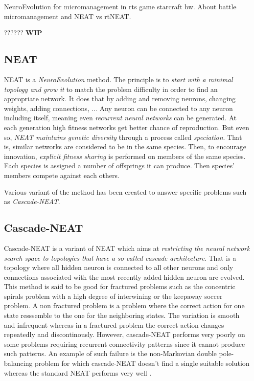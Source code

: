 NeuroEvolution for micromanagement in rts game starcraft bw. About
battle micromanagement and NEAT vs rtNEAT. \cite{ShWa13}

???\citet{SiSuBa14}???
{\bf WIP}

\subsection{NEAT}\label{subsec:neat}

NEAT is a \emph{NeuroEvolution} method. The principle is to
\emph{start with a minimal topology and grow it} to match the problem
difficulty in order to find an appropriate network.  It does that by
adding and removing neurons, changing weights, adding connections, ...
Any neuron can be connected to any neuron including itself, meaning
even \emph{recurrent neural networks} can be generated.  At each
generation high fitness networks get better chance of
reproduction. But even so, \emph{NEAT maintains genetic diversity}
through a process called \emph{speciation}. That is, similar networks
are considered to be in the same species. Then, to encourage
innovation, \emph{explicit fitness sharing} is performed on members of
the same species. Each species is assigned a number of offsprings it
can produce. Then species' members compete against each
others. \cite{StMi02}

Various variant of the method has been created to answer specific
problems such as \emph{Cascade-NEAT}.

\subsection{Cascade-NEAT}\label{subsec:cascade-neat}

Cascade-NEAT is a variant of NEAT which aims at \emph{restricting the neural network
search space to topologies that have a so-called cascade architecture}. That is
a topology where all hidden neuron is connected to all other neurons and
only connections associated with the most recently added hidden neuron are evolved.
This method is said to be good for fractured problems such as the concentric spirals
problem with a high degree of interwining or the keepaway soccer problem.
A non fractured problem is a problem where the correct action for one state
resssemble to the one for the neighboring states. The variation is smooth
and infrequent whereas in a fractured problem the correct action changes
repeatedly and discontinously.
However, cascade-NEAT performs very poorly on some problems requiring recurrent
connectivity patterns since it cannot produce such patterns. An example of
such failure is the non-Markovian double pole-balancing problem for which
cascade-NEAT doesn't find a single suitable solution whereas the standard NEAT
performs very well \cite{KoAS09} \cite{KoMi09}.

